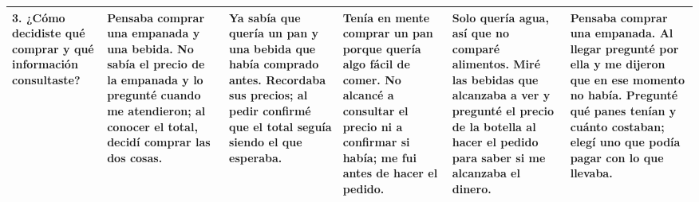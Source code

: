 \documentclass[12pt]{article}
\newcommand{\sol}[1]{{\color{solutionred}\small\strut #1\strut}}
\begin{document}
\begin{longtable}{|*{6}{L{\dimexpr(\arrayrulewidth)/6\relax}|}}
\textbf{3.} ¿Cómo decidiste qué comprar y qué información consultaste? & \sol{Pensaba comprar una empanada y una bebida. No sabía el precio de la empanada y lo pregunté cuando me atendieron; al conocer el total, decidí comprar las dos cosas.} & \sol{Ya sabía que quería un pan y una bebida que había comprado antes. Recordaba sus precios; al pedir confirmé que el total seguía siendo el que esperaba.} & \sol{Tenía en mente comprar un pan porque quería algo fácil de comer. No alcancé a consultar el precio ni a confirmar si había; me fui antes de hacer el pedido.} & \sol{Solo quería agua, así que no comparé alimentos. Miré las bebidas que alcanzaba a ver y pregunté el precio de la botella al hacer el pedido para saber si me alcanzaba el dinero.} & \sol{Pensaba comprar una empanada. Al llegar pregunté por ella y me dijeron que en ese momento no había. Pregunté qué panes tenían y cuánto costaban; elegí uno que podía pagar con lo que llevaba.} \\ \hline


\end{longtable}
\end{document}
